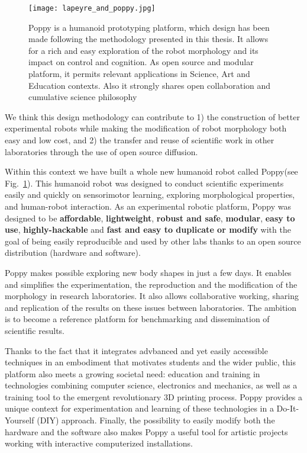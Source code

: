 \begin{figure}[tb]
    \begin{center}
        \texttt{[image: lapeyre\_and\_poppy.jpg]}
    \end{center}
    \caption{Poppy is a humanoid prototyping platform, which design has been made following the methodology presented in this thesis. It allows for a rich and easy exploration of the robot morphology and its impact on control and cognition. As open source and modular platform, it permits relevant applications in Science, Art and Education contexts. Also it strongly shares open collaboration and cumulative science philosophy}
    \label{fig:poppy_with_me}
\end{figure}

We think this design methodology can contribute to  1) the construction of better experimental robots while making the modification of robot morphology both easy and low cost, and 2) the transfer and reuse of scientific work in other laboratories through the use of open source diffusion.

Within this context we have built a whole new humanoid robot called Poppy\texttrademark (see Fig.~\ref{fig:poppy_with_me}). This humanoid robot was designed to conduct scientific experiments easily and quickly on sensorimotor learning, exploring morphological properties, and human-robot interaction. As an experimental robotic platform, Poppy was designed to be \textbf{affordable}, \textbf{lightweight}, \textbf{robust and safe}, \textbf{modular}, \textbf{easy to use}, \textbf{highly-hackable} and \textbf{fast and easy to duplicate or modify} with the goal of being easily reproducible and used by other labs thanks to an open source distribution (hardware and software).



Poppy makes possible exploring new body shapes in just a few days. It enables and simplifies the experimentation, the reproduction and the modification of the morphology in research laboratories. It also allows collaborative working, sharing and replication of the results on these issues between laboratories. The ambition is to become a reference platform for benchmarking and dissemination of scientific results.

Thanks to the fact that it integrates advbanced and yet easily accessible techniques in an embodiment that motivates students and the wider public, this platform also meets a growing societal need: education and training in technologies combining computer science, electronics and mechanics, as well as a training tool to the emergent revolutionary 3D printing process. Poppy provides a unique context for experimentation and learning of these technologies in a Do-It-Yourself (DIY) approach. Finally, the possibility to easily modify both the hardware and the software also makes Poppy a useful tool for artistic projects working with interactive computerized installations.


